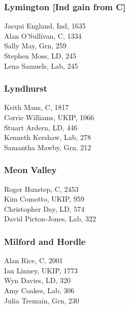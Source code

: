 \documentclass[a4paper,openany,10pt]{book}
\begin{document}
\subsubsection*{Lymington \hspace*{\fill}\nolinebreak[1]%
\enspace\hspace*{\fill}
[Ind gain from C]}



Jacqui England, Ind, 1635\\
Alan O'Sullivan, C, 1334\\
Sally May, Grn, 259\\
Stephen Moss, LD, 245\\
Lena Samuels, Lab, 245\\


\subsubsection*{Lyndhurst}



Keith Mans, C, 1817\\
Corrie Williams, UKIP, 1066\\
Stuart Ardern, LD, 446\\
Kenneth Kershaw, Lab, 278\\
Samantha Mawby, Grn, 212\\


\subsubsection*{Meon Valley}



Roger Huxstep, C, 2453\\
Kim Comotto, UKIP, 959\\
Christopher Day, LD, 574\\
David Picton-Jones, Lab, 322\\


\subsubsection*{Milford and Hordle}



Alan Rice, C, 2001\\
Ian Linney, UKIP, 1773\\
Wyn Davies, LD, 320\\
Amy Coakes, Lab, 306\\
Julia Tremain, Grn, 230\\
\end{document}
